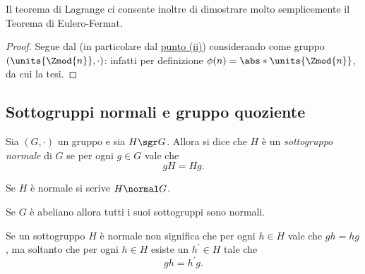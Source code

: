 Il teorema di Lagrange ci consente inoltre di dimostrare molto semplicemente il Teorema di Eulero-Fermat.
\begin{proof}
    Segue dal  (in particolare dal \hyperref[cor:x_alla_ordG=e_G]{punto (ii)}) considerando come gruppo $(\units{\Zmod{n}}, \cdot)$: infatti per definizione $\phi(n) = \abs*{\units{\Zmod{n}}}$, da cui la tesi.
\end{proof}

\subsection{Sottogruppi normali e gruppo quoziente}

\begin{definition}
     \label{def:sgr_normale}
    Sia $(G, \cdot)$ un gruppo e sia $H \sgr G$. Allora si dice che $H$ è un \emph{sottogruppo normale} di $G$ se per ogni $g \in G$ vale che \begin{equation} \label{eq:def_normale}
        gH = Hg.
    \end{equation} 
    
    Se $H$ è normale si scrive $H \normal G$.
\end{definition}

\begin{remark}
    Se $G$ è abeliano allora tutti i suoi sottogruppi sono normali.
\end{remark}
\begin{remark}
    Se un sottogruppo $H$ è normale non significa che per ogni $h \in H$ vale che $gh = hg$, ma soltanto che per ogni $h \in H$ esiste un $h^\prime \in H$ tale che \[
        gh = h^\prime g.    
    \]
\end{remark}

